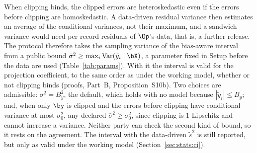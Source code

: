 When clipping binds, the clipped errors are heteroskedastic even if the errors before clipping are homoskedastic. A data-driven residual variance then estimates an average of the conditional variances, not their maximum, and a sandwich variance would need per-record residuals of $\Op$'s data, that is, a further release. The protocol therefore takes the sampling variance of the bias-aware interval from a public bound $\bar\sigma^2 \ge \max_i \operatorname{Var}(\tilde y_i \mid \bX)$, a parameter fixed in Setup before the data are used (Table~\ref{tab:params}). With it the interval is valid for the projection coefficient, to the same order as under the working model, whether or not clipping binds (proofs, Part~B, Proposition~S10b). Two choices are admissible: $\bar\sigma^2 = B_y^2$, the default, which holds with no model because $|\tilde y_i| \le B_y$; and, when only $\by$ is clipped and the errors before clipping have conditional variance at most $\sigma_0^2$, any declared $\bar\sigma^2 \ge \sigma_0^2$, since clipping is $1$-Lipschitz and cannot increase a variance. Neither party can check the second kind of bound, so it rests on the agreement. The interval with the data-driven $\tilde s^2$ is still reported, but only as valid under the working model (Section~\ref{sec:stats:ci}).

